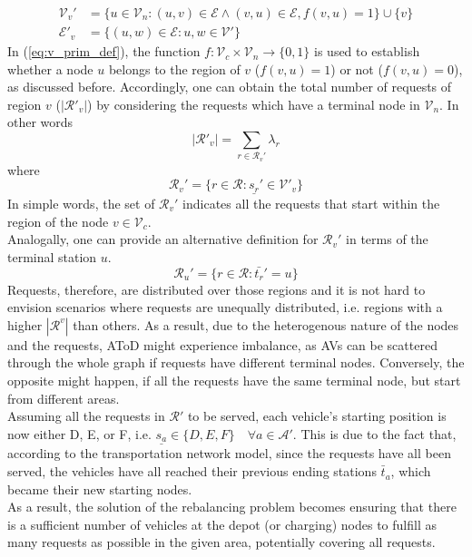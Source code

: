 \begin{align}
\mathcal{V}_v' &= \{ u \in \mathcal{V}_n : (u, v) \in \mathcal{E} \wedge (v, u) \in \mathcal{E} , f(v,u) = 1 \} \cup \{ v\} \label{eq:v_prim_def}\\
\mathcal{E}'_v &= \{ (u, w) \in \mathcal{E} : u, w \in \mathcal{V}' \} 
\end{align}
In (\ref{eq:v_prim_def}), the function $f :  \mathcal{V}_c \times \mathcal{V}_n \rightarrow \{0,1\}$ is used to establish whether a node $u$ belongs to the region of $v$ ($f(v,u) = 1$) or not ($f(v,u) = 0$), as discussed before. Accordingly, one can obtain the total number of requests of region $v$ ($|\mathcal{R}'_v|$) by considering the requests which have a terminal node in $\mathcal{V}_n$. In other words
\begin{equation}
|\mathcal{R}'_v| = \sum_{r \in \mathcal{R}_v'} \lambda_r
\end{equation}
where 
\begin{equation}
\mathcal{R}_v'= \{ r \in \mathcal{R} : \underline{s_r}' \in \mathcal{V'}_v \} \label{eq:req_per_reg}
\end{equation}
In simple words, the set of $\mathcal{R}_v'$ indicates all the requests that start within the region of the node $v \in \mathcal{V}_c$. \\
Analogally, one can provide an alternative definition for $\mathcal{R}_v'$ in terms of the terminal station $u$.
\begin{equation}
	\mathcal{R}_u'= \{ r \in \mathcal{R} : \bar{t_r}' = u \}%
\end{equation}
Requests, therefore, are distributed over those regions and it is not hard to envision scenarios where requests are unequally distributed, i.e. regions with a higher $|\mathcal{R}^v| $ than others. As a result, due to the heterogenous nature of the nodes and the requests, AToD might experience imbalance, as AVs can be scattered through the whole graph if requests have different terminal nodes. Conversely, the opposite might happen, if all the requests have the same terminal node, but start from different areas. \\ 
Assuming all the requests in $\mathcal{R}'$ to be served, each vehicle's starting position is now either D, E, or F, i.e. $\underline{s_a} \in \{D, E, F\} \quad \forall a \in \mathcal{A}'$. This is due to the fact that, according to the transportation network model, since the requests have all been served, the vehicles have all reached their previous ending stations $\bar{t}_a$, which became their new starting nodes. \\
As a result, the solution of the rebalancing problem becomes ensuring that there is a sufficient number of vehicles at the depot (or charging) nodes to fulfill as many requests as possible in the given area, potentially covering all requests.

